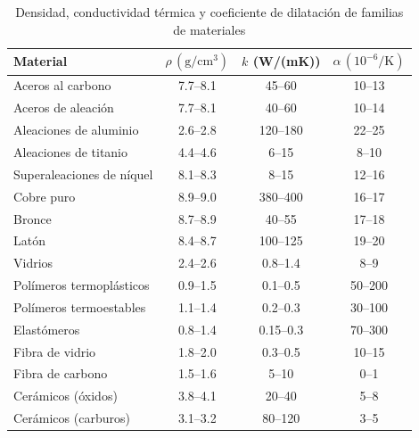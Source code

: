 \begin{table}[h!]
	\centering
	\small
	\caption{Densidad, conductividad térmica y coeficiente de dilatación de familias de materiales}
	\label{tab:prop_mat_fisicas_sin_costo}
	\begin{tabular}{@{} l c c c @{}}
		\toprule
		Material                  & $\rho\, \mathrm{(g/cm^{3})}$ & $k$ (W/(mK)) & $\alpha\,\mathrm{(10^{-6}/K)}$ \\
		\midrule
		Aceros al carbono         & 7.7–8.1           & 45–60               & 10–13                  \\
		Aceros de aleación        & 7.7–8.1           & 40–60               & 10–14                  \\
		Aleaciones de aluminio    & 2.6–2.8           & 120–180             & 22–25                  \\
		Aleaciones de titanio     & 4.4–4.6           & 6–15                & 8–10                   \\
		Superaleaciones de níquel & 8.1–8.3           & 8–15                & 12–16                  \\
		Cobre puro                & 8.9–9.0           & 380–400             & 16–17                  \\
		Bronce                    & 8.7–8.9           & 40–55               & 17–18                  \\
		Latón                     & 8.4–8.7           & 100–125             & 19–20                  \\
		Vidrios                   & 2.4–2.6           & 0.8–1.4             & 8–9                    \\
		Polímeros termoplásticos  & 0.9–1.5           & 0.1–0.5             & 50–200                 \\
		Polímeros termoestables   & 1.1–1.4           & 0.2–0.3             & 30–100                 \\
		Elastómeros               & 0.8–1.4           & 0.15–0.3            & 70–300                 \\
		Fibra de vidrio           & 1.8–2.0           & 0.3–0.5             & 10–15                  \\
		Fibra de carbono          & 1.5–1.6           & 5–10                & 0–1                    \\
		Cerámicos (óxidos)        & 3.8–4.1           & 20–40               & 5–8                    \\
		Cerámicos (carburos)      & 3.1–3.2           & 80–120              & 3–5                    \\
		\bottomrule
	\end{tabular}
\end{table}

